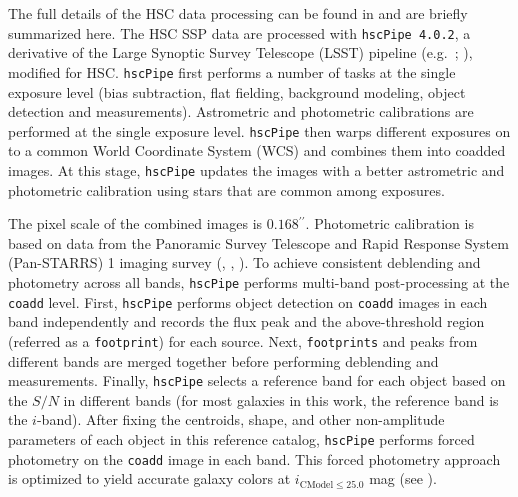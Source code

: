 \documentclass[a4paper,fleqn,usenatbib]{mnras}
\def\asec{$^{\prime\prime}$}
\begin{document}
    The full details of the HSC data processing can be found in \citet{Bosch2017}
    and are briefly summarized here. 
    The HSC SSP data are processed with \texttt{hscPipe 4.0.2}, a derivative of the 
    Large Synoptic Survey Telescope (LSST) pipeline (e.g.\ \citealt{Juric2015}; 
    \citealt{Axelrod2010}), modified for HSC. 
    \texttt{hscPipe} first performs a number of tasks at the single exposure level 
    (bias subtraction, flat fielding, background modeling, object detection and 
    measurements). 
    Astrometric and photometric calibrations are performed at the single exposure 
    level. 
    \texttt{hscPipe} then warps different exposures on to a common World Coordinate 
    System (WCS) and combines them into coadded images. 
    At this stage, \texttt{hscPipe} updates the images with a better astrometric and 
    photometric calibration using stars that are common among exposures. 
    
    The pixel scale of the combined images is $0.168$\asec{}. 
    Photometric calibration is based on data from the Panoramic Survey Telescope 
    and Rapid Response System (Pan-STARRS) 1 imaging survey 
    (\citealt{Schlafly2012}, \citealt{Tonry2012}, \citealt{Magnier2013}). 
    To achieve consistent deblending and photometry across all bands, \texttt{hscPipe} 
    performs multi-band post-processing at the \texttt{coadd} level. 
    First, \texttt{hscPipe} performs object detection on \texttt{coadd} images in 
    each band independently and records the flux peak and the above-threshold region 
    (referred as a \texttt{footprint}) for each source. 
    Next, \texttt{footprints} and peaks from different bands are merged together before     
    performing deblending and measurements. 
    Finally, \texttt{hscPipe} selects a reference band for each object based on the 
    $S/N$ in different bands (for most galaxies in this work, the reference band is 
    the $i$-band). 
    After fixing the centroids, shape, and other non-amplitude parameters of each 
    object in this reference catalog, \texttt{hscPipe} performs forced photometry 
    on the \texttt{coadd} image in each band. 
    This forced photometry approach is optimized to yield accurate galaxy colors
    at $i_{\mathrm{CModel}\leq25.0}$ mag (see \citealt{SynPipe}).
       
\end{document}
